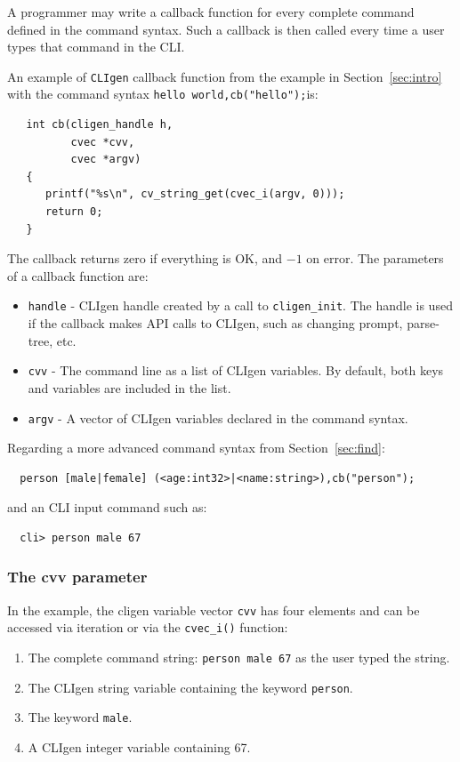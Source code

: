 \documentclass[a4paper, 10pt] {article}
\begin{document}
A programmer may write a callback function for every complete command
defined in the command syntax. Such a callback is then called every
time a user types that command in the CLI.

An example of {\tt CLIgen} callback function from the example in
Section~\ref{sec:intro} with the command syntax {\tt hello world,cb("hello");}is:

\begin{verbatim}
   int cb(cligen_handle h, 
          cvec *cvv, 
          cvec *argv)
   {
      printf("%s\n", cv_string_get(cvec_i(argv, 0)));
      return 0;
   }
\end{verbatim}
The callback returns zero if everything is OK, and $-1$ on error. The parameters of a callback function are:
\begin{itemize}
\item
{\tt handle} - CLIgen handle created by a call to {\tt cligen\_init}. The handle is used if the callback makes API calls to CLIgen, such as changing prompt, parse-tree, etc.
\item
{\tt cvv} - The command line as a list of CLIgen variables. By default, both keys and variables are included in the list.
\item
{\tt argv} - A vector of CLIgen variables declared in the command syntax.
\end{itemize}

Regarding a more advanced command syntax from Section~\ref{sec:find}:
\begin{verbatim}
  person [male|female] (<age:int32>|<name:string>),cb("person");
\end{verbatim}
and an CLI input command such as:
\begin{verbatim}
  cli> person male 67
\end{verbatim}

\subsubsection{The cvv parameter}

In the example, the cligen variable vector {\tt cvv} has four elements and can be accessed via iteration or via the {\tt cvec\_i()} function:
\begin{enumerate}
\item The complete command string: {\tt person male 67} as the user typed the string.
\item The CLIgen string variable containing the keyword {\tt person}.
\item The keyword {\tt male}.
\item A CLIgen integer variable containing 67.
\end{enumerate}
\end{document}
